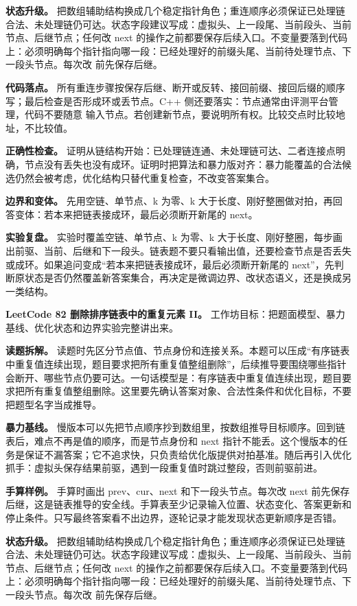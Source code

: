 \textbf{状态升级。} 把数组辅助结构换成几个稳定指针角色；重连顺序必须保证已处理链合法、未处理链仍可达。状态字段建议写成：虚拟头、上一段尾、当前段头、当前节点、后继节点；任何改 next 的操作之前都要保存后续入口。不变量要落到代码上：必须明确每个指针指向哪一段：已经处理好的前缀头尾、当前待处理节点、下一段头节点。每次改  前先保存后继。

\textbf{代码落点。} 所有重连步骤按保存后继、断开或反转、接回前缀、接回后缀的顺序写；最后检查是否形成环或丢节点。C++ 侧还要落实：节点通常由评测平台管理，代码不要随意  输入节点。若创建新节点，要说明所有权。比较交点时比较地址，不比较值。

\textbf{正确性检查。} 证明从链结构开始：已处理链连通、未处理链可达、二者连接点明确，节点没有丢失也没有成环。证明时把算法和暴力版对齐：暴力能覆盖的合法候选仍然会被考虑，优化结构只替代重复检查，不改变答案集合。

\textbf{边界和变体。} 先用空链、单节点、k 为零、k 大于长度、刚好整圈做对拍，再回答变体：若本来把链表接成环，最后必须断开新尾的 next。

\textbf{实验复盘。} 实验时覆盖空链、单节点、k 为零、k 大于长度、刚好整圈，每步画出前驱、当前、后继和下一段头。链表题不要只看输出值，还要检查节点是否丢失或成环。如果追问变成“若本来把链表接成环，最后必须断开新尾的 next”，先判断原状态是否仍然覆盖新答案集合，再决定是微调边界、改状态语义，还是换成另一类结构。

\noindent\textbf{LeetCode 82 删除排序链表中的重复元素 II。} 工作坊目标：把题面模型、暴力基线、优化状态和边界实验完整讲出来。

\textbf{读题拆解。} 读题时先区分节点值、节点身份和连接关系。本题可以压成“有序链表中重复值连续出现，题目要求把所有重复值整组删除”，后续推导要围绕哪些指针会断开、哪些节点仍要可达。一句话模型是：有序链表中重复值连续出现，题目要求把所有重复值整组删除。这里要先确认答案对象、合法性条件和优化目标，不要把题型名字当成推导。

\textbf{暴力基线。} 慢版本可以先把节点顺序抄到数组里，按数组推导目标顺序。回到链表后，难点不再是值的顺序，而是节点身份和 next 指针不能丢。这个慢版本的任务是保证不漏答案；它不追求快，只负责给优化版提供对拍基准。随后再引入优化抓手：虚拟头保存结果前驱，遇到一段重复值时跳过整段，否则前驱前进。

\textbf{手算样例。} 手算时画出 prev、cur、next 和下一段头节点。每次改 next 前先保存后继，这是链表推导的安全线。手算表至少记录输入位置、状态变化、答案更新和停止条件。只写最终答案看不出边界，逐轮记录才能发现状态更新顺序是否错。

\textbf{状态升级。} 把数组辅助结构换成几个稳定指针角色；重连顺序必须保证已处理链合法、未处理链仍可达。状态字段建议写成：虚拟头、上一段尾、当前段头、当前节点、后继节点；任何改 next 的操作之前都要保存后续入口。不变量要落到代码上：必须明确每个指针指向哪一段：已经处理好的前缀头尾、当前待处理节点、下一段头节点。每次改  前先保存后继。

